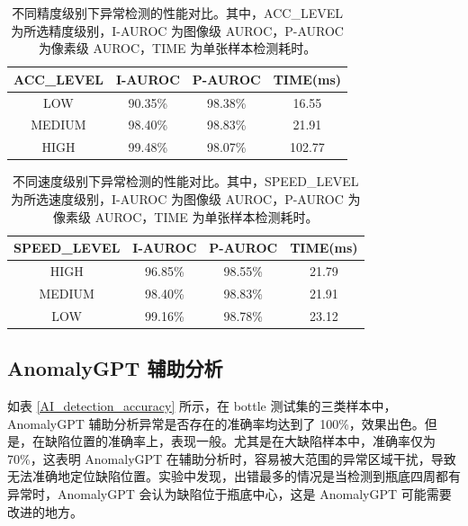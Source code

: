 \documentclass[
  ]{njuthesis}
\begin{document}
\begin{table}[H]
    \centering
    \caption{不同精度级别下异常检测的性能对比。其中，ACC\_LEVEL 为所选精度级别，I-AUROC 为图像级 AUROC，P-AUROC 为像素级 AUROC，TIME 为单张样本检测耗时。}
    \label{acc_level_comparison}
    \renewcommand\arraystretch{0.5}
    \begin{tabular}{c|c|c|c}
    \toprule[1.5pt]
    ACC\_LEVEL & I-AUROC & P-AUROC & TIME(ms) \\
    \midrule[1pt]
    LOW & 90.35\% & 98.38\% & 16.55 \\
    \midrule[0.5pt]
    MEDIUM & 98.40\% & 98.83\% & 21.91 \\
    \midrule[0.5pt]
    HIGH & 99.48\% & 98.07\% & 102.77 \\
    \bottomrule[1.5pt]
    \end{tabular}
\end{table}

\begin{table}[H]
    \centering
    \caption{不同速度级别下异常检测的性能对比。其中，SPEED\_LEVEL 为所选速度级别，I-AUROC 为图像级 AUROC，P-AUROC 为像素级 AUROC，TIME 为单张样本检测耗时。}
    \label{speed_level_comparison}
    \renewcommand\arraystretch{0.5}
    \begin{tabular}{c|c|c|c}
    \toprule[1.5pt]
    SPEED\_LEVEL & I-AUROC & P-AUROC & TIME(ms) \\
    \midrule[1pt]
    HIGH & 96.85\% & 98.55\% & 21.79 \\
    \midrule[0.5pt]
    MEDIUM & 98.40\% & 98.83\% & 21.91 \\
    \midrule[0.5pt]
    LOW & 99.16\% & 98.78\% & 23.12 \\
    \bottomrule[1.5pt]
    \end{tabular}
\end{table}


\subsection{AnomalyGPT 辅助分析}

如表 \ref{AI_detection_accuracy} 所示，在 bottle 测试集的三类样本中，AnomalyGPT 辅助分析异常是否存在的准确率均达到了 100\%，效果出色。但是，在缺陷位置的准确率上，表现一般。尤其是在大缺陷样本中，准确率仅为 70\%，这表明 AnomalyGPT 在辅助分析时，容易被大范围的异常区域干扰，导致无法准确地定位缺陷位置。实验中发现，出错最多的情况是当检测到瓶底四周都有异常时，AnomalyGPT 会认为缺陷位于瓶底中心，这是 AnomalyGPT 可能需要改进的地方。
\end{document}

